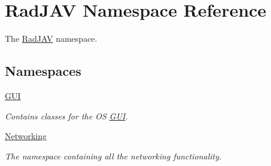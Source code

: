 \hypertarget{namespace_rad_j_a_v}{}\section{Rad\+J\+AV Namespace Reference}
\label{namespace_rad_j_a_v}


The \hyperlink{namespace_rad_j_a_v}{Rad\+J\+AV} namespace.  


\subsection*{Namespaces}
\begin{DoxyCompactItemize}
\item 
 \hyperlink{namespace_rad_j_a_v_1_1_g_u_i}{G\+UI}
\begin{DoxyCompactList}\small\item\em Contains classes for the OS \hyperlink{namespace_rad_j_a_v_1_1_g_u_i}{G\+UI}. \end{DoxyCompactList}\item 
 \hyperlink{namespace_rad_j_a_v_1_1_networking}{Networking}
\begin{DoxyCompactList}\small\item\em The namespace containing all the networking functionality. \end{DoxyCompactList}\end{DoxyCompactItemize}
